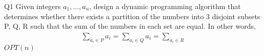 \begin{problem}
  {Q1}
  Given integers $a_1, \dots , a_n$, design a dynamic programming algorithm that determines
  whether there exists a partition of the numbers into 3 disjoint subsets P, Q, R such that the sum
  of the numbers in each set are equal. In other words,
  \begin{align*}
      \sum_{a_i \in P} a_i = \sum_{a_i \in Q} a_i = \sum_{a_i \in R}
  \end{align*}
  \noindent
  $OPT(n)$
\end{problem}
